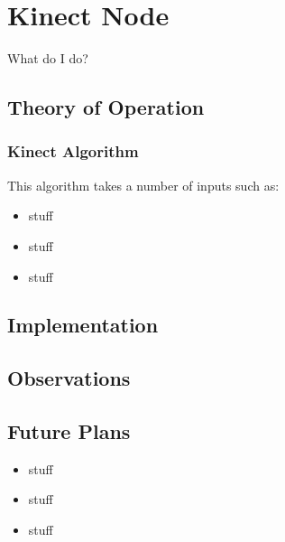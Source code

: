 \section{Kinect Node}

What do I do?

\subsection{Theory of Operation}


\subsubsection{Kinect Algorithm}
 This algorithm takes a number
of inputs such as:


\begin{itemize}
\item
  stuff
\item
  stuff
\item
  stuff
\end{itemize}


\subsection{Implementation}



\subsection{Observations}


\subsection{Future Plans}

\begin{itemize}
\item
  stuff
\item
  stuff
\item
  stuff
\end{itemize}
